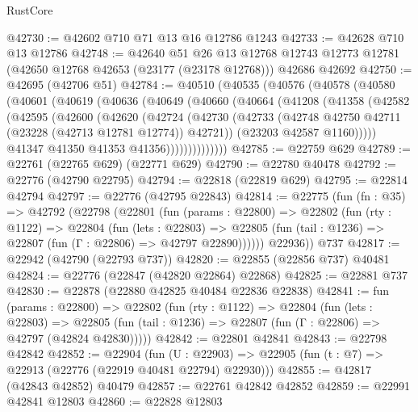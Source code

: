 \begin{lexlean}{RustCore}
\begin{coremodule}
@42730 := @42602 @710 @71 @13 @16 @12786 @1243
@42733 := @42628 @710 @13 @12786
@42748 := @42640
    @51
    @26
    @13
    @12768
    @12743
    @12773
    @12781
    (@42650 @12768 @42653 (@23177 (@23178 @12768)))
    @42686
    @42692
@42750 := @42695 (@42706 @51)
@42784 := @40510
    (@40535
      (@40576
        (@40578
          (@40580
            (@40601
              (@40619
                (@40636
                  (@40649
                    (@40660
                      (@40664
                        (@41208
                          (@41358
                            (@42582
                              (@42595
                                (@42600
                                  (@42620
                                    (@42724
                                      (@42730
                                        (@42733
                                          (@42748
                                            @42750
                                            @42711
                                            (@23228 (@42713 @12781 @12774))
                                            @42721))
                                        (@23203 @42587 @1160)))))
                                @41347
                                @41350
                                @41353
                                @41356))))))))))))))
@42785 := @22759 @629
@42789 := @22761 (@22765 @629) (@22771 @629)
@42790 := @22780 @40478
@42792 := @22776 (@42790 @22795)
@42794 := @22818 (@22819 @629)
@42795 := @22814 @42794
@42797 := @22776 (@42795 @22843)
@42814 := @22775
    (fun (fn : @35) =>
    @42792
      (@22798
        (@22801
          (fun (params : @22800) =>
          @22802
            (fun (rty : @1122) =>
            @22804
              (fun (lets : @22803) =>
              @22805 (fun (tail : @1236) => @22807 (fun (Γ : @22806) => @42797 @22890))))))
        @22936))
    @737
@42817 := @22942 (@42790 (@22793 @737))
@42820 := @22855 (@22856 @737) @40481
@42824 := @22776 (@22847 (@42820 @22864) @22868)
@42825 := @22881 @737
@42830 := @22878 (@22880 @42825 @40484 @22836 @22838)
@42841 := fun (params : @22800) =>
  @22802
    (fun (rty : @1122) =>
    @22804
      (fun (lets : @22803) =>
      @22805 (fun (tail : @1236) => @22807 (fun (Γ : @22806) => @42797 (@42824 @42830)))))
@42842 := @22801 @42841
@42843 := @22798 @42842
@42852 := @22904
    (fun (U : @22903) => @22905 (fun (t : @7) => @22913 (@22776 (@22919 @40481 @22794) @22930)))
@42855 := @42817 (@42843 @42852) @40479
@42857 := @22761 @42842 @42852
@42859 := @22991 @42841 @12803
@42860 := @22828 @12803

\end{coremodule}
\end{lexlean}

